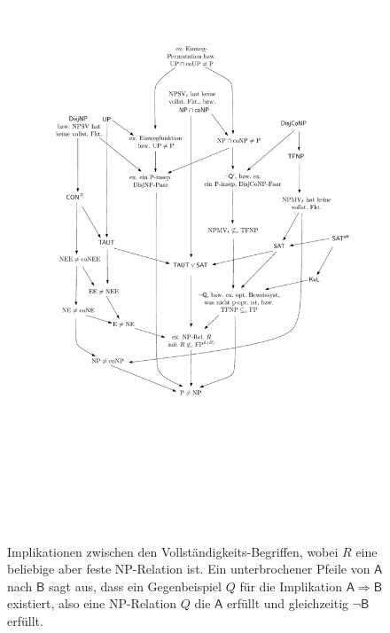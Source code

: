 \begin{figure}
    \centering\includegraphics[page=2]{figures.pdf}
    \caption{Implikationen zwischen den  Vollständigkeits-Begriffen, wobei $R$ eine beliebige aber feste NP-Relation ist. Ein unterbrochener Pfeile von $\mathsf{A}$ nach $\mathsf{B}$ sagt aus, dass ein Gegenbeispiel $Q$ für die Implikation $\mathsf{A\Rightarrow B}$ existiert, also eine NP-Relation $Q$ die $\mathsf{A}$ erfüllt und gleichzeitig $\neg\mathsf{B}$ erfüllt.}\label{fig:reduktionsbegriffe}
    \forcerectofloat
\end{figure}




